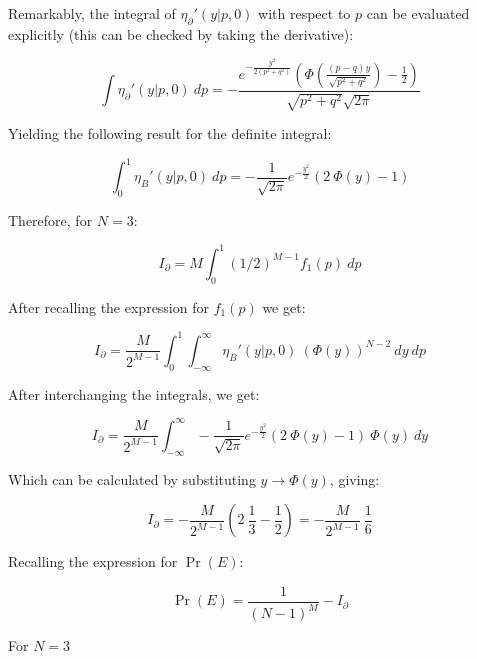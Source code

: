 \documentclass{article}
\theoremstyle{definition}
\begin{document}
Remarkably, the integral of $\eta_\partial'(y|p,0)$ with respect to $p$ can be evaluated explicitly (this can be checked by taking the derivative):

\begin{equation}
\int \eta_\partial'(y|p,0) \ dp
=
-\frac{e^{-\frac{y^2}{2 (p^2 + q^2)}} \left( \Phi\left( \frac{(p - q) y}{\sqrt{p^2 + q^2}} \right) - \frac{1}{2} \right)}{\sqrt{p^2 + q^2} \sqrt{2 \pi}}
\end{equation}

Yielding the following result for the definite integral:

\begin{equation}
\int_0^1 \eta_B'(y|p,0) \ dp
=
- \frac{1}{\sqrt{2 \pi}} e^{-\frac{y^2}{2}}
\left(
2 \ \Phi(y) - 1
\right)
\end{equation}

Therefore, for $N=3$:

\begin{equation}
    I_\partial = M \int_0^1 (1/2)^{M-1} f_1(p) \ dp
\end{equation}

After recalling the expression for $f_1(p)$ we get:

\begin{equation}
    I_\partial = \frac{M}{2^{M-1}} \int_0^1 
    \int_{-\infty}^\infty \eta_B'(y|p,0) \  (\Phi(y))^{N-2} 
    \ d y
    \ dp
\end{equation}

After interchanging the integrals, we get:

\begin{equation}
    I_\partial = \frac{M}{2^{M-1}}
    \int_{-\infty}^\infty 
    - \frac{1}{\sqrt{2 \pi}} e^{-\frac{y^2}{2}}
\left(
2 \ \Phi(y) - 1
\right)
    \  \Phi(y)
    \ d y
\end{equation}

Which can be calculated by substituting $y \to \Phi(y)$, giving:

\begin{equation}
    I_\partial = -\frac{M}{2^{M-1}}
\left(
2 \ \frac{1}{3} - \frac{1}{2}
\right)
=
 -\frac{M}{2^{M-1}} \ \frac{1}{6}
\end{equation}


Recalling the expression for $\Pr(E)$:

\begin{equation}
    \Pr(E) 
    = 
    \frac{1}{(N-1)^M}
    - I_\partial
\end{equation}

For $N=3$
\end{document}

